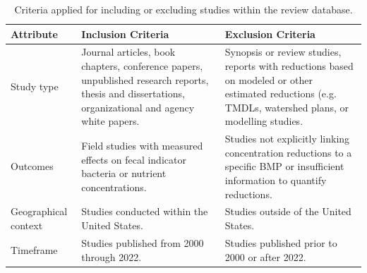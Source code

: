 \documentclass[utf8]{FrontiersinHarvard}
\begin{document}
\begin{table}

\caption{\label{tab:criteria}Criteria applied for including or excluding studies within the review database.}
\centering
\begin{tabular}[t]{>{\raggedright\arraybackslash}p{5em}>{\raggedright\arraybackslash}p{15em}>{\raggedright\arraybackslash}p{15em}}
\toprule
Attribute & Inclusion Criteria & Exclusion Criteria\\
\midrule
Study type & Journal articles, book chapters, conference papers, unpublished research reports, thesis and dissertations, organizational and agency white papers. & Synopsis or review studies, reports with reductions based on modeled or other estimated reductions (e.g. TMDLs, watershed plans, or modelling studies.\\
Outcomes & Field studies with measured effects on fecal indicator bacteria or nutrient concentrations. & Studies not explicitly linking concentration reductions to a specific BMP or insufficient information to quantify reductions.\\
Geographical context & Studies conducted within the United States. & Studies outside of the United States.\\
Timeframe & Studies published from 2000 through 2022. & Studies published prior to 2000 or after 2022.\\
\bottomrule
\end{tabular}
\end{table}
\end{document}

